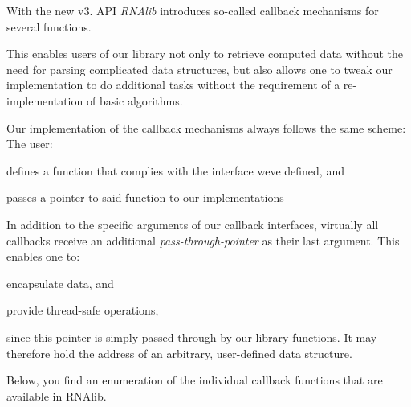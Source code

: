 With the new v3. A\+PI {\itshape R\+N\+Alib} introduces so-\/called callback mechanisms for several functions.

This enables users of our library not only to retrieve computed data without the need for parsing complicated data structures, but also allows one to tweak our implementation to do additional tasks without the requirement of a re-\/implementation of basic algorithms.

Our implementation of the callback mechanisms always follows the same scheme\+: The user\+:
\begin{DoxyItemize}
\item defines a function that complies with the interface we\textquotesingle{}ve defined, and
\item passes a pointer to said function to our implementations
\end{DoxyItemize}

In addition to the specific arguments of our callback interfaces, virtually all callbacks receive an additional {\itshape pass-\/through-\/pointer} as their last argument. This enables one to\+:
\begin{DoxyItemize}
\item encapsulate data, and
\item provide thread-\/safe operations,
\end{DoxyItemize}

since this pointer is simply passed through by our library functions. It may therefore hold the address of an arbitrary, user-\/defined data structure.

Below, you find an enumeration of the individual callback functions that are available in R\+N\+Alib.


